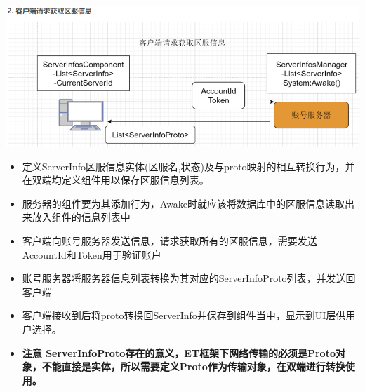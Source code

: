 \documentclass[9pt, b5paper]{article}
\begin{document}
\includegraphics[width=.9\linewidth]{./pic/readme_20230124_103245.png}
\begin{itemize}
\item 定义ServerInfo区服信息实体(区服名,状态)及与proto映射的相互转换行为，并在双端均定义组件用以保存区服信息列表。
\item 服务器的组件要为其添加行为，Awake时就应该将数据库中的区服信息读取出来放入组件的信息列表中
\item 客户端向账号服务器发送信息，请求获取所有的区服信息，需要发送AccountId和Token用于验证账户
\item 账号服务器将服务器信息列表转换为其对应的ServerInfoProto列表，并发送回客户端
\item 客户端接收到后将proto转换回ServerInfo并保存到组件当中，显示到UI层供用户选择。
\item \textbf{注意 ServerInfoProto存在的意义，ET框架下网络传输的必须是Proto对象，不能直接是实体，所以需要定义Proto作为传输对象，在双端进行转换使用。}
\end{itemize}
\end{document}
